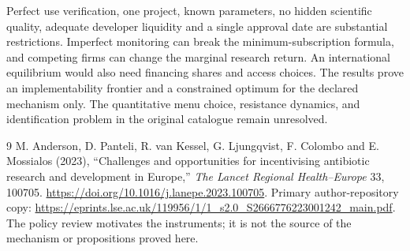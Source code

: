 \documentclass[11pt,a4paper]{article}
\theoremstyle{definition}
\theoremstyle{remark}
\begin{document}
Perfect use verification, one project, known parameters, no hidden scientific quality, adequate developer liquidity and a single approval date are substantial restrictions. Imperfect monitoring can break the minimum-subscription formula, and competing firms can change the marginal research return. An international equilibrium would also need financing shares and access choices. The results prove an implementability frontier and a constrained optimum for the declared mechanism only. The quantitative menu choice, resistance dynamics, and identification problem in the original catalogue remain unresolved.

\begin{thebibliography}{9}
 M. Anderson, D. Panteli, R. van Kessel, G. Ljungqvist, F. Colombo and E. Mossialos (2023), ``Challenges and opportunities for incentivising antibiotic research and development in Europe,'' \emph{The Lancet Regional Health--Europe} 33, 100705. \url{https://doi.org/10.1016/j.lanepe.2023.100705}. Primary author-repository copy: \url{https://eprints.lse.ac.uk/119956/1/1_s2.0_S2666776223001242_main.pdf}. The policy review motivates the instruments; it is not the source of the mechanism or propositions proved here.
\end{thebibliography}
\end{document}
